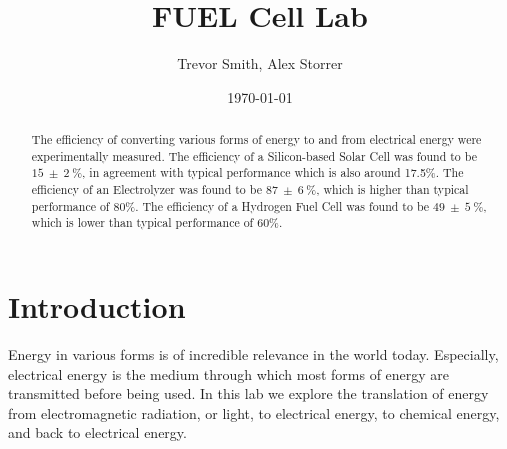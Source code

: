 \documentclass[aps,prl,reprint]{revtex4-2}
\begin{document}

\title{FUEL Cell Lab}


\author{Trevor Smith, Alex Storrer}


\date{\today}

\begin{abstract}
	The efficiency of converting various forms of energy to and from 
	electrical energy were experimentally measured. The efficiency of a
	Silicon-based Solar Cell was found to be $15\ \pm\ 2\ \%$, in agreement
	with typical performance which is also around 17.5\%. The efficiency
	of an Electrolyzer was found to
	be $87\ \pm\ 6\ \%$, which is higher than typical performance of 80\%. The 
	efficiency of a Hydrogen Fuel Cell was found to be $49\ \pm\ 5\ \%$,
	which is lower than typical performance of 60\%. 
\end{abstract}


\maketitle

\section{Introduction}

Energy in various forms is of incredible relevance in the world today. Especially, electrical energy is the medium through
which most forms of energy are transmitted before being used. In this lab we explore the translation of energy from 
electromagnetic radiation, or light, to electrical energy, to chemical energy, and back to electrical energy.
\end{document}
